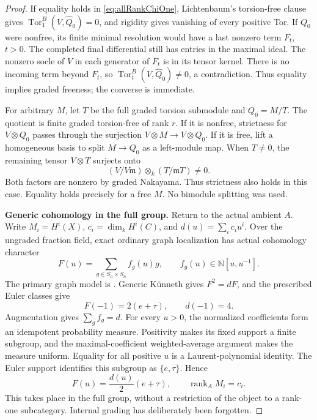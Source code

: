 \documentclass[11pt,a4paper]{article}
\renewcommand{\S}{\ensuremath{\mathsection}}
\theoremstyle{named}\newtheorem{finding}{Finding}[section]
\theoremstyle{definition}\newtheorem{definition}[finding]{Definition}
\theoremstyle{remark}\newtheorem{remark}[finding]{Remark}
\begin{document}
\begin{proof}
If equality holds in \eqref{eq:allRankChiOne},
Lichtenbaum's torsion-free clause gives
\(\operatorname{Tor}_1^B(V,\widehat Q_0)=0\),
and rigidity gives vanishing of every positive Tor.
If \(Q_0\) were nonfree, its finite minimal resolution
would have a last nonzero term \(F_t\), \(t>0\).
The completed final differential still has entries
in the maximal ideal. The nonzero socle of \(V\)
in each generator of \(F_t\) is in its tensor kernel.
There is no incoming term beyond \(F_t\), so
\(\operatorname{Tor}_t^B(V,\widehat Q_0)\ne0\),
a contradiction. Thus equality implies graded
freeness; the converse is immediate.

For arbitrary \(M\), let \(T\) be the full graded
torsion submodule and \(Q_0=M/T\). The quotient is
finite graded torsion-free of rank \(r\).
If it is nonfree, strictness for \(V\otimes Q_0\)
passes through the surjection \(V\otimes M\to
V\otimes Q_0\). If it is free, lift a homogeneous
basis to split \(M\to Q_0\) as a left-module map.
When \(T\ne0\), the remaining tensor \(V\otimes T\)
surjects onto
\[
 (V/V\mathfrak m)\otimes_k(T/\mathfrak mT)\ne0.
\]
Both factors are nonzero by graded Nakayama.
Thus strictness also holds in this case.
Equality holds precisely for a free \(M\).
No bimodule splitting was used.

\par\smallskip\noindent\textbf{Generic cohomology in the full group.}\quad
Return to the actual ambient \(A\).
Write \(M_i=H^i(X)\), \(c_i=\dim_kH^i(C)\),
and \(d(u)=\sum_i c_i u^i\).
Over the ungraded fraction field, exact ordinary
graph localization has actual cohomology character
\[
 F(u)=\sum_{g\in S_n\times S_n}f_g(u)g,
 \qquad f_g(u)\in\mathbb N[u,u^{-1}].
\]
The primary graph model is
\cite[\S\S1.1--1.2, equations (1.1)--(1.2),
Theorem~1.6 and Remark~1.7]{EWLocalized}.
Generic K\"unneth gives \(F^2=dF\), and the
prescribed Euler classes give
\[
                    F(-1)=2(e+\tau),\qquad d(-1)=4.
\]
Augmentation gives \(\sum_gf_g=d\).
For every \(u>0\), the normalized coefficients
form an idempotent probability measure.
Positivity makes its fixed support a finite subgroup,
and the maximal-coefficient weighted-average argument
makes the measure uniform. Equality for all positive
\(u\) is a Laurent-polynomial identity.
The Euler support identifies this subgroup as
\(\{e,\tau\}\). Hence
\begin{equation}\label{eq:allRankUniformGraphs}
 F(u)=\frac{d(u)}2(e+\tau),\qquad
 \operatorname{rank}_A M_i=c_i.
\end{equation}
This takes place in the full group, without a
restriction of the object to a rank-one subcategory.
Internal grading has deliberately been forgotten.


\end{proof}
\end{document}

